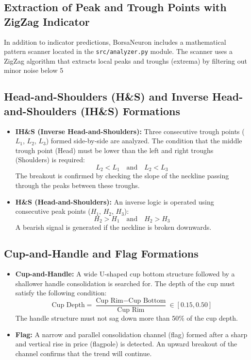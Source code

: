 \documentclass[12pt,a4paper]{report}
\begin{document}
\subsection{Extraction of Peak and Trough Points with ZigZag Indicator}
In addition to indicator predictions, BorsaNeuron includes a mathematical pattern scanner located in the \texttt{src/analyzer.py} module. The scanner uses a ZigZag algorithm that extracts local peaks and troughs (extrema) by filtering out minor noise below 5%

\subsection{Head-and-Shoulders (H\&S) and Inverse Head-and-Shoulders (IH\&S) Formations}
\begin{itemize}
    \item \textbf{IH\&S (Inverse Head-and-Shoulders):} Three consecutive trough points ($L_1$, $L_2$, $L_3$) formed side-by-side are analyzed. The condition that the middle trough point (Head) must be lower than the left and right troughs (Shoulders) is required:
    \begin{equation}
    L_2 < L_1 \quad \text{and} \quad L_2 < L_3
    \end{equation}
    The breakout is confirmed by checking the slope of the neckline passing through the peaks between these troughs.
    \item \textbf{H\&S (Head-and-Shoulders):} An inverse logic is operated using consecutive peak points ($H_1$, $H_2$, $H_3$):
    \begin{equation}
    H_2 > H_1 \quad \text{and} \quad H_2 > H_3
    \end{equation}
    A bearish signal is generated if the neckline is broken downwards.
\end{itemize}

\subsection{Cup-and-Handle and Flag Formations}
\begin{itemize}
    \item \textbf{Cup-and-Handle:} A wide U-shaped cup bottom structure followed by a shallower handle consolidation is searched for. The depth of the cup must satisfy the following condition:
    \begin{equation}
    \text{Cup Depth} = \frac{\text{Cup Rim} - \text{Cup Bottom}}{\text{Cup Rim}} \in [0.15, 0.50]
    \end{equation}
    The handle structure must not sag down more than 50\% of the cup depth.
    \item \textbf{Flag:} A narrow and parallel consolidation channel (flag) formed after a sharp and vertical rise in price (flagpole) is detected. An upward breakout of the channel confirms that the trend will continue.
\end{itemize}
\end{document}
